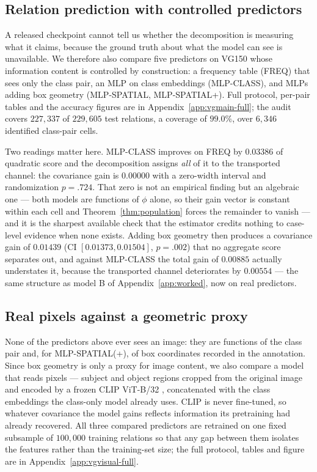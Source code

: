 \subsection{Relation prediction with controlled predictors}\label{app:vgmain}\label{sec:data}

A released checkpoint cannot tell us whether the decomposition is measuring what it claims,
because the ground truth about what the model can see is unavailable. We therefore also
compare five predictors on VG150 whose information content is controlled by construction: a
frequency table (FREQ) that sees only the class pair, an MLP on class embeddings
(MLP-CLASS), and MLPs adding box geometry (MLP-SPATIAL, MLP-SPATIAL+). Full protocol,
per-pair tables and the accuracy figures are in Appendix~\ref{app:vgmain-full}; the audit
covers $227{,}337$ of $229{,}605$ test relations, a coverage of $99.0\%$, over $6{,}346$
identified class-pair cells.

Two readings matter here. MLP-CLASS improves on FREQ by $0.03386$ of quadratic score and
the decomposition assigns \emph{all} of it to the transported channel: the covariance gain
is $0.00000$ with a zero-width interval and randomization $p=.724$. That zero is not an
empirical finding but an algebraic one --- both models are functions of $\phi$ alone, so
their gain vector is constant within each cell and Theorem~\ref{thm:population} forces the
remainder to vanish --- and it is the sharpest available check that the estimator credits
nothing to case-level evidence when none exists. Adding box geometry then produces a
covariance gain of $0.01439$ (CI $[0.01373,0.01504]$, $p=.002$) that no aggregate score
separates out, and against MLP-CLASS the total gain of $0.00885$ actually understates it,
because the transported channel deteriorates by $0.00554$ --- the same structure as model B of
Appendix~\ref{app:worked}, now on real predictors.

\subsection{Real pixels against a geometric proxy}\label{app:vgvisual}\label{sec:vgvisual}

None of the predictors above ever sees an image: they are functions of the class pair and, for
MLP-SPATIAL(+), of box coordinates recorded in the annotation. Since box geometry is only a
proxy for image content, we also compare a model that reads pixels --- subject and object
regions cropped from the original image and encoded by a frozen CLIP ViT-B/32
\citep{radford2021learning}, concatenated with the class embeddings the class-only model
already uses. CLIP is never fine-tuned, so whatever covariance the model gains reflects
information its pretraining had already recovered. All three compared predictors are
retrained on one fixed subsample of $100{,}000$ training relations so that any gap between
them isolates the features rather than the training-set size; the full protocol, tables and figure are in
Appendix~\ref{app:vgvisual-full}.

